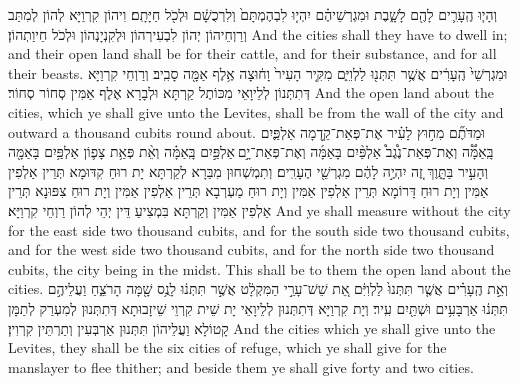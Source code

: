 {וְהָי֧וּ הֶֽעָרִ֛ים לָהֶ֖ם לָשָׁ֑בֶת וּמִגְרְשֵׁיהֶ֗ם יִהְי֤וּ לִבְהֶמְתָּם֙ וְלִרְכֻשָׁ֔ם וּלְכֹ֖ל חַיָּתָֽם׃
}
{וִיהוֹן קִרְוַיָּא לְהוֹן לְמִתַּב וְרַוְחֵיהוֹן יְהוֹן לִבְעִירְהוֹן וּלְקִנְיָנְהוֹן וּלְכֹל חֵיוַתְהוֹן׃}
{And the cities shall they have to dwell in; and their open land shall be for their cattle, and for their substance, and for all their beasts.}{}
{וּמִגְרְשֵׁי֙ הֶֽעָרִ֔ים אֲשֶׁ֥ר תִּתְּנ֖וּ לַלְוִיִּ֑ם מִקִּ֤יר הָעִיר֙ וָח֔וּצָה אֶ֥לֶף אַמָּ֖ה סָבִֽיב׃
}
{וְרַוְחֵי קִרְוַיָּא דְּתִתְּנוֹן לְלֵיוָאֵי מִכּוֹתֶל קַרְתָּא וּלְבָרָא אֶלֶף אַמִּין סְחוֹר סְחוֹר׃}
{And the open land about the cities, which ye shall give unto the Levites, shall be from the wall of the city and outward a thousand cubits round about.}{}
{וּמַדֹּתֶ֞ם מִח֣וּץ לָעִ֗יר אֶת־פְּאַת־קֵ֣דְמָה אַלְפַּ֪יִם בָּֽאַמָּ֟ה וְאֶת־פְּאַת־נֶ֩גֶב֩ אַלְפַּ֨יִם בָּאַמָּ֜ה וְאֶת־פְּאַת־יָ֣ם \legarmeh  אַלְפַּ֣יִם בָּֽאַמָּ֗ה וְאֵ֨ת פְּאַ֥ת צָפ֛וֹן אַלְפַּ֥יִם בָּאַמָּ֖ה וְהָעִ֣יר בַּתָּ֑וֶךְ זֶ֚ה יִהְיֶ֣ה לָהֶ֔ם מִגְרְשֵׁ֖י הֶעָרִֽים׃}
{וְתִמְשְׁחוּן מִבַּרָא לְקַרְתָּא יָת רוּחַ קִדּוּמָא תְּרֵין אַלְפִין אַמִּין וְיָת רוּחַ דָּרוֹמָא תְּרֵין אַלְפִין אַמִּין וְיָת רוּחַ מַעְרְבָא תְּרֵין אַלְפִין אַמִּין וְיָת רוּחַ צִפּוּנָא תְּרֵין אַלְפִין אַמִּין וְקַרְתָּא בִּמְצִיעַ דֵּין יְהֵי לְהוֹן רַוְחֵי קִרְוַיָּא׃}
{And ye shall measure without the city for the east side two thousand cubits, and for the south side two thousand cubits, and for the west side two thousand cubits, and for the north side two thousand cubits, the city being in the midst. This shall be to them the open land about the cities.}{}
{וְאֵ֣ת הֶֽעָרִ֗ים אֲשֶׁ֤ר תִּתְּנוּ֙ לַלְוִיִּ֔ם אֵ֚ת שֵׁשׁ־עָרֵ֣י הַמִּקְלָ֔ט אֲשֶׁ֣ר תִּתְּנ֔וּ לָנֻ֥ס שָׁ֖מָּה הָרֹצֵ֑חַ וַעֲלֵיהֶ֣ם תִּתְּנ֔וּ אַרְבָּעִ֥ים וּשְׁתַּ֖יִם עִֽיר׃}
{וְיָת קִרְוַיָּא דְּתִתְּנוּן לְלֵיוָאֵי יָת שֵׁית קִרְוֵי שֵׁיזָבוּתָא דְּתִתְּנוּן לְמִעְרַק לְתַמָּן קָטוֹלָא וַעֲלֵיהוֹן תִּתְּנוּן אַרְבְּעִין וְתַרְתֵּין קִרְוִין׃}
{And the cities which ye shall give unto the Levites, they shall be the six cities of refuge, which ye shall give for the manslayer to flee thither; and beside them ye shall give forty and two cities.}{}

